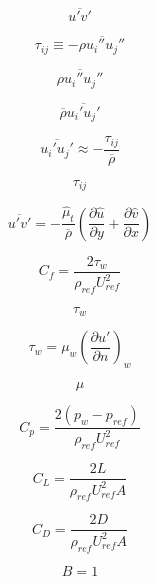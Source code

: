 

\begin{equation}
\overline{u'v'}
\end{equation}

\begin{equation}
\tau_{ij} \equiv - \overline{\rho u_i''u_j''}
\end{equation}

\begin{equation}
\overline{\rho u_i''u_j''}
\end{equation}

\begin{equation}
\overline{\rho} \overline{u_i'u_j'}
\end{equation}

\begin{equation}
\overline{u_i'u_j'} \approx - \frac{\tau_{ij}}{\overline{\rho}}
\end{equation}

\begin{equation}
\tau_{ij}
\end{equation}

\begin{equation}
\overline{u'v'} = - \frac{\hat \mu_t}{\overline{\rho}} \left(
\frac{\partial \hat u}{\partial y} + \frac{\partial \hat v}{\partial x} \right)
\end{equation}

\begin{equation}
C_f = \frac{2 \tau_w}{\rho_{ref}U_{ref}^2}
\end{equation}

\begin{equation}
\tau_w
\end{equation}

\begin{equation}
\tau_w=\mu_w \left( \frac{\partial u'}{\partial n} \right)_w 
\end{equation}

\begin{equation}
\mu
\end{equation}

\begin{equation}
C_p = \frac{2 \left(p_w-p_{ref}\right)}{\rho_{ref}U_{ref}^2}
\end{equation}

\begin{equation}
C_L = \frac{2 L}{\rho_{ref}U_{ref}^2 A}
\end{equation}

\begin{equation}
C_D = \frac{2 D}{\rho_{ref}U_{ref}^2 A}
\end{equation}

\begin{equation}
B=1
\end{equation}


